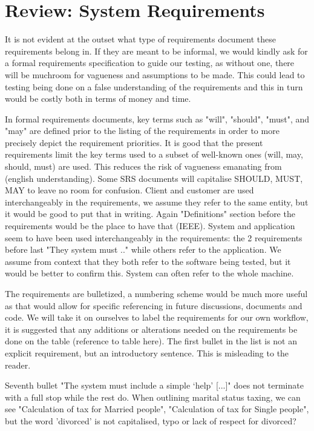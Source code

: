 \section{Review: System Requirements}

It is not evident at the outset what type of requirements document these requirements belong in. If they are meant to be informal, we would kindly ask for a formal requirements specification to guide our testing, as without one, there will be muchroom for vagueness and assumptions to be made. This could lead to testing being done on a false understanding of the requirements and this in turn would be costly both in terms of money and time.  

In formal requirements documents, key terms such as "will", "should", "must", and "may" are defined prior to the listing of the requirements in order to more precisely depict the requirement priorities.
It is good that the present requirements limit the key terms used to a subset of well-known ones (will, may, should, must) are used. This reduces the risk of vagueness emanating from (english understanding). 
Some SRS documents will capitalise SHOULD, MUST, MAY to leave no room for confusion. 
Client and customer are used interchangeably in the requirements, we assume they refer to the same entity, but it would be good to put that in writing. Again "Definitions" section before the requirements would be the place to have that (IEEE).
System and application seem to have been used interchangeably in the requirements: the 2 requirements before last "They system must .." while others refer to the application. We assume from context that they both refer to the software being tested, but it would be better to confirm this. System can often refer to the whole machine. 


The requirements are bulletized, a numbering scheme would be much more useful as that would allow for specific referencing in future discussions, documents and code. 
We will take it on ourselves to label the requirements for our own workflow, it is suggested that any additions or alterations needed on the requirements be done on the table (reference to table here). 
The first bullet in the list is not an explicit requirement, but an introductory sentence. This is misleading to the reader. 

Seventh bullet "The system must include a simple ‘help’ [...]" does not terminate with a full stop while the rest do. 
When outlining marital status taxing, we can see "Calculation of tax for Married people", "Calculation of tax for Single people", but the word 'divorced' is not capitalised, typo or lack of respect for divorced?  

